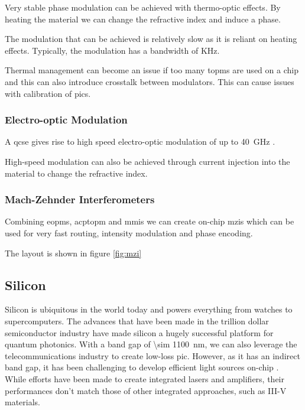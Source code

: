 Very stable phase modulation can be achieved with thermo-optic effects. By heating the material we can change the refractive index and induce a phase.

The modulation that can be achieved is relatively slow as it is reliant on heating effects. Typically, the modulation has a bandwidth of KHz. 

Thermal management can become an issue if too many \acp{topm} are used on a chip and this can also introduce crosstalk between modulators. This can cause issues with calibration of \acp{pic}.

\subsubsection*{Electro-optic Modulation}

A \ac{qcse} gives rise to high speed electro-optic modulation of up to \SI{40}{GHz} \cite{jeppix}.

High-speed modulation can also be achieved through current injection into the material to change the refractive index. 

\subsubsection*{Mach-Zehnder Interferometers}

Combining \acp{eopm}, acp{topm} and \acp{mmi} we can create on-chip \acp{mzi} which can be used for very fast routing, intensity modulation and phase encoding. 

The layout is shown in figure \ref{fig:mzi}

\subsection{Silicon}

Silicon is ubiquitous in the world today and powers everything from watches to supercomputers. The advances that have been made in the trillion dollar semiconductor industry have made silicon a hugely successful platform for quantum photonics. With a band gap of \SI{\sim 1100}{nm}, we can also leverage the telecommunications industry to create low-loss \acl{pic}. However, as it has an indirect band gap, it has been challenging to develop efficient light sources on-chip \cite{}. While efforts have been made to create integrated lasers and amplifiers, their performances don't match those of other integrated approaches, such as III-V materials.

